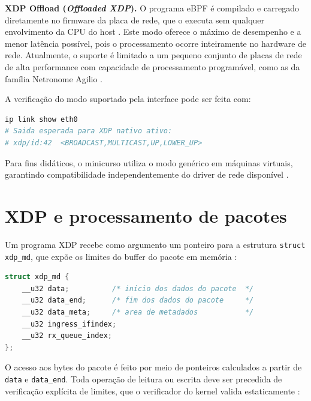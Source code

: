 \textbf{XDP Offload (\textit{Offloaded XDP}).}
O programa eBPF é compilado e carregado diretamente no firmware da placa de rede,
que o executa sem qualquer envolvimento da CPU do host \cite{linuxkernel2024}.
Este modo oferece o máximo de desempenho e a menor latência possível, pois o
processamento ocorre inteiramente no hardware de rede.
Atualmente, o suporte é limitado a um pequeno conjunto de placas de rede de alta
performance com capacidade de processamento programável, como as da família
Netronome Agilio \cite{gregg2019}.

A verificação do modo suportado pela interface pode ser feita com:

\begin{lstlisting}[language=bash,
  caption={Verificação do modo XDP suportado pela interface de rede.}]
ip link show eth0
# Saida esperada para XDP nativo ativo:
# xdp/id:42  <BROADCAST,MULTICAST,UP,LOWER_UP>
\end{lstlisting}

Para fins didáticos, o minicurso utiliza o modo genérico em máquinas virtuais,
garantindo compatibilidade independentemente do driver de rede disponível
\cite{plinta2026repo}.

\section{XDP e processamento de pacotes}

Um programa XDP recebe como argumento um ponteiro para a estrutura
\texttt{struct xdp\_md}, que expõe os limites do buffer do pacote em memória
\cite{linuxkernel2024}:

\begin{lstlisting}[language=C,
  caption={Estrutura de contexto de um programa XDP.}]
struct xdp_md {
    __u32 data;          /* inicio dos dados do pacote  */
    __u32 data_end;      /* fim dos dados do pacote     */
    __u32 data_meta;     /* area de metadados           */
    __u32 ingress_ifindex;
    __u32 rx_queue_index;
};
\end{lstlisting}

O acesso aos bytes do pacote é feito por meio de ponteiros calculados a partir de
\texttt{data} e \texttt{data\_end}.
Toda operação de leitura ou escrita deve ser precedida de verificação explícita de
limites, que o verificador do kernel valida estaticamente \cite{linuxkernel2024}:

